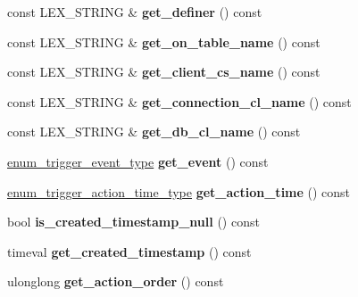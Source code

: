 \begin{DoxyCompactItemize}
const L\+E\+X\+\_\+\+S\+T\+R\+I\+NG \& {\bfseries get\+\_\+definer} () const
\item 
\mbox{\label{classTrigger_a3ed3fc222283c3c3464d2bfafb9b1dd0}} 
const L\+E\+X\+\_\+\+S\+T\+R\+I\+NG \& {\bfseries get\+\_\+on\+\_\+table\+\_\+name} () const
\item 
\mbox{\label{classTrigger_aa0f9f5220c41dee522450a569ad9ee2e}} 
const L\+E\+X\+\_\+\+S\+T\+R\+I\+NG \& {\bfseries get\+\_\+client\+\_\+cs\+\_\+name} () const
\item 
\mbox{\label{classTrigger_acf19cf397f230689aba471051f7d60a6}} 
const L\+E\+X\+\_\+\+S\+T\+R\+I\+NG \& {\bfseries get\+\_\+connection\+\_\+cl\+\_\+name} () const
\item 
\mbox{\label{classTrigger_ae0df09758d39225465c63550c0e6b470}} 
const L\+E\+X\+\_\+\+S\+T\+R\+I\+NG \& {\bfseries get\+\_\+db\+\_\+cl\+\_\+name} () const
\item 
\mbox{\label{classTrigger_a93f26f8a87d98a12e1b5ef3e7fca4948}} 
\mbox{\hyperlink{trigger__def_8h_a25c92abc3a183d6950b0d9a4ee846e5e}{enum\+\_\+trigger\+\_\+event\+\_\+type}} {\bfseries get\+\_\+event} () const
\item 
\mbox{\label{classTrigger_a1349def1eed978503f3a97e56ecde579}} 
\mbox{\hyperlink{trigger__def_8h_ace20981b1217cca2d3a23e2338fd61b9}{enum\+\_\+trigger\+\_\+action\+\_\+time\+\_\+type}} {\bfseries get\+\_\+action\+\_\+time} () const
\item 
\mbox{\label{classTrigger_aa4c14dec5efc0b740fc01827e7c8466e}} 
bool {\bfseries is\+\_\+created\+\_\+timestamp\+\_\+null} () const
\item 
\mbox{\label{classTrigger_aa85d8cf24343e6e118847ec2dd7e4c2c}} 
timeval {\bfseries get\+\_\+created\+\_\+timestamp} () const
\item 
\mbox{\label{classTrigger_a0ff5145d0ea9edf2f614113045c08c0e}} 
ulonglong {\bfseries get\+\_\+action\+\_\+order} () const
\item 
\mbox{\label{classTrigger_a39ad9c73d5be5d4935122835e81a19db}} 

\end{DoxyCompactItemize}
